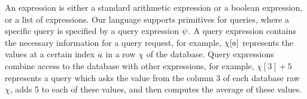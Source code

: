 An expression is
either a standard arithmetic expression or a boolean expression, or a list of expressions.
Our language supports primitives for queries, where a specific query is specified by a query expression $\psi$. A query expression contains the necessary information for a query request, for example, $\chi[a]$ represents the values at a certain index $a$ in a row $\chi$ of the database. Query expressions combine access to the database with other expressions, for example, $\chi[3] + 5$ represents a query which asks the value from the column 3 of each database raw $\chi$, adds 5 to each of these values, and then computes the average of these values.


